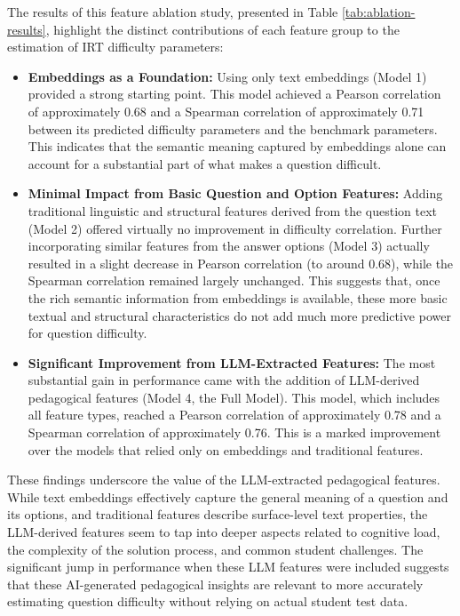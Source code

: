 \documentclass[
    a4paper, %
    10pt, %
    twoside, %
]{LTJournalArticle}
\begin{document}
The results of this feature ablation study, presented in Table \ref{tab:ablation-results}, highlight the distinct contributions of each feature group to the estimation of IRT difficulty parameters:

\begin{itemize}
    \item \textbf{Embeddings as a Foundation:} Using only text embeddings (Model 1) provided a strong starting point. This model achieved a Pearson correlation of approximately 0.68 and a Spearman correlation of approximately 0.71 between its predicted difficulty parameters and the benchmark parameters. This indicates that the semantic meaning captured by embeddings alone can account for a substantial part of what makes a question difficult.

    \item \textbf{Minimal Impact from Basic Question and Option Features:} Adding traditional linguistic and structural features derived from the question text (Model 2) offered virtually no improvement in difficulty correlation. Further incorporating similar features from the answer options (Model 3) actually resulted in a slight decrease in Pearson correlation (to around 0.68), while the Spearman correlation remained largely unchanged. This suggests that, once the rich semantic information from embeddings is available, these more basic textual and structural characteristics do not add much more predictive power for question difficulty.

    \item \textbf{Significant Improvement from LLM-Extracted Features:} The most substantial gain in performance came with the addition of LLM-derived pedagogical features (Model 4, the Full Model). This model, which includes all feature types, reached a Pearson correlation of approximately 0.78 and a Spearman correlation of approximately 0.76. This is a marked improvement over the models that relied only on embeddings and traditional features.
\end{itemize}

These findings underscore the value of the LLM-extracted pedagogical features. While text embeddings effectively capture the general meaning of a question and its options, and traditional features describe surface-level text properties, the LLM-derived features seem to tap into deeper aspects related to cognitive load, the complexity of the solution process, and common student challenges. The significant jump in performance when these LLM features were included suggests that these AI-generated pedagogical insights are relevant to more accurately estimating question difficulty without relying on actual student test data.
\end{document}
